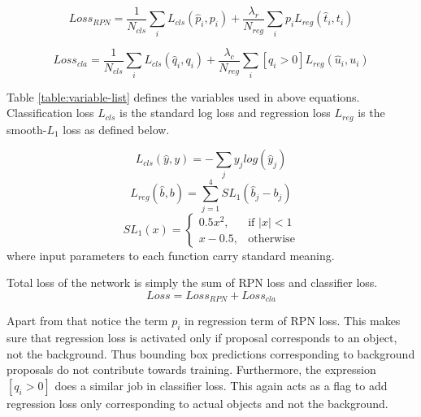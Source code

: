 $$Loss_{RPN}= \frac{1}{N_{cls}}\sum_i L_{cls}(\hat{p}_i,p_i) + \frac{\lambda_r}{N_{reg}}\sum_i p_i L_{reg}(\hat{t}_i,t_i)$$

\begin{small}
$$Loss_{cla} = \frac{1}{N_{cls}}\sum_i L_{cls}(\hat{q}_i,q_i) + \frac{\lambda_c}{N_{reg}}\sum_i [q_i > 0] L_{reg}(\hat{u}_i,u_i)$$
\end{small}
Table \ref{table:variable-list} defines the variables used in above equations. Classification loss $L_{cls}$ is the standard log loss and regression loss $L_{reg}$ is the smooth-$L_1$ loss as defined below. 

$$ L_{cls}(\hat{y},y) = -\sum_j y_jlog(\hat{y}_j) $$
$$ L_{reg}(\hat{b},b) = \sum_{j=1}^4 SL_1(\hat{b}_j - b_j) $$
$$SL_1(x) = \begin{cases}
0.5x^2, & \text{if } |x|<1 \\
x-0.5,  & \text{otherwise}
\end{cases}
$$
where input parameters to each function carry standard meaning. 

Total loss of the network is simply the sum of RPN loss and classifier loss.
$$ Loss = Loss_{RPN} + Loss_{cla} $$

Apart from that notice the term $p_i$ in regression term of RPN loss. This makes sure that regression loss is activated only if proposal corresponds to an object, not the background.  Thus bounding box predictions corresponding to background proposals do not contribute towards training. Furthermore, the expression $[q_i>0]$ does a similar job in classifier loss. This again acts as a flag to add regression loss only corresponding to actual objects and not the background. 

